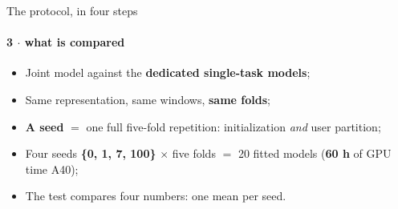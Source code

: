 \documentclass{beamer}
\begin{document}
\begin{frame}{The protocol, in four steps}
    \framesubtitle{3 $\cdot$ what is compared}

    \begin{itemize}
        \item Joint model against the \textbf{dedicated single-task models};
        \item Same representation, same windows, \textbf{same folds};
        \item \textbf{A seed} $=$ one full five-fold repetition: initialization \emph{and} user partition;
        \item Four seeds \textbf{\{0, 1, 7, 100\}} $\times$ five folds $=$ \alert{20 fitted models} (\textbf{60 h} of GPU time A40);
        \item The test compares \alert{four numbers}: one mean per seed.
    \end{itemize}

\end{frame}
\end{document}
